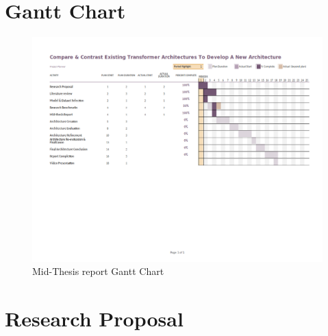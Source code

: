 \documentclass[a4paper,12pt]{report}
\begin{document}
    
   \begin{appendices}
    	\chapter{Gantt Chart}\label{cgc}
		    \begin{figure}[!h]
		       	\centering
		        \includegraphics[scale=0.55,angle=90]{../images/GanttChart-mid.png}
		     	\caption{Mid-Thesis report Gantt Chart}\label{ganttChartMid}
              \end{figure}
         \chapter{Research Proposal}\label{crp}
         
    \end{appendices}
\end{document}
